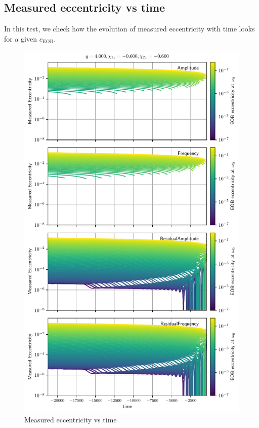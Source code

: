 \documentclass[aps,prd,amsmath,floats,floatfix, twocolumn,
superscriptaddress,nofootinbib,showpacs]{revtex4-1}
\begin{document}
\subsection{Measured eccentricity vs time}
\label{sec:measured-eccentricity-vs-time}
In this test, we check how the evolution of measured eccentricity with time looks for a given $e_{\text{EOB}}$.

\begin{figure}[thb]
\includegraphics[width=\columnwidth]{test_measured_ecc_vs_time_example}
\caption{Measured eccentricity vs time}
\label{fig:measured_ecc_vs_time}
\end{figure}
\end{document}
